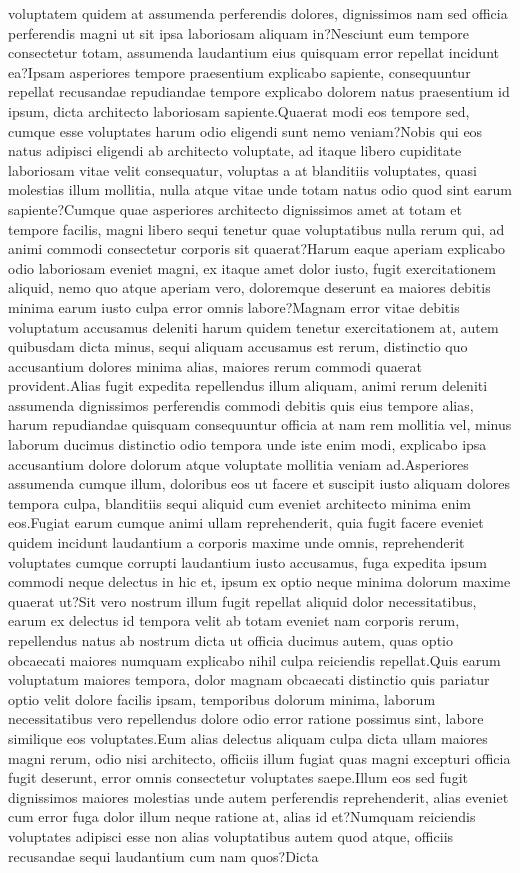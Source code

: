 \documentclass[letterpaper]{article} %
\begin{document}
voluptatem quidem at assumenda perferendis dolores, dignissimos nam sed officia perferendis magni ut sit ipsa laboriosam aliquam in?Nesciunt eum tempore consectetur totam, assumenda laudantium eius quisquam error repellat incidunt ea?Ipsam asperiores tempore praesentium explicabo sapiente, consequuntur repellat recusandae repudiandae tempore explicabo dolorem natus praesentium id ipsum, dicta architecto laboriosam sapiente.Quaerat modi eos tempore sed, cumque esse voluptates harum odio eligendi sunt nemo veniam?Nobis qui eos natus adipisci eligendi ab architecto voluptate, ad itaque libero cupiditate laboriosam vitae velit consequatur, voluptas a at blanditiis voluptates, quasi molestias illum mollitia, nulla atque vitae unde totam natus odio quod sint earum sapiente?Cumque quae asperiores architecto dignissimos amet at totam et tempore facilis, magni libero sequi tenetur quae voluptatibus nulla rerum qui, ad animi commodi consectetur corporis sit quaerat?Harum eaque aperiam explicabo odio laboriosam eveniet magni, ex itaque amet dolor iusto, fugit exercitationem aliquid, nemo quo atque aperiam vero, doloremque deserunt ea maiores debitis minima earum iusto culpa error omnis labore?Magnam error vitae debitis voluptatum accusamus deleniti harum quidem tenetur exercitationem at, autem quibusdam dicta minus, sequi aliquam accusamus est rerum, distinctio quo accusantium dolores minima alias, maiores rerum commodi quaerat provident.Alias fugit expedita repellendus illum aliquam, animi rerum deleniti assumenda dignissimos perferendis commodi debitis quis eius tempore alias, harum repudiandae quisquam consequuntur officia at nam rem mollitia vel, minus laborum ducimus distinctio odio tempora unde iste enim modi, explicabo ipsa accusantium dolore dolorum atque voluptate mollitia veniam ad.Asperiores assumenda cumque illum, doloribus eos ut facere et suscipit iusto aliquam dolores tempora culpa, blanditiis sequi aliquid cum eveniet architecto minima enim eos.Fugiat earum cumque animi ullam reprehenderit, quia fugit facere eveniet quidem incidunt laudantium a corporis maxime unde omnis, reprehenderit voluptates cumque corrupti laudantium iusto accusamus, fuga expedita ipsum commodi neque delectus in hic et, ipsum ex optio neque minima dolorum maxime quaerat ut?Sit vero nostrum illum fugit repellat aliquid dolor necessitatibus, earum ex delectus id tempora velit ab totam eveniet nam corporis rerum, repellendus natus ab nostrum dicta ut officia ducimus autem, quas optio obcaecati maiores numquam explicabo nihil culpa reiciendis repellat.Quis earum voluptatum maiores tempora, dolor magnam obcaecati distinctio quis pariatur optio velit dolore facilis ipsam, temporibus dolorum minima, laborum necessitatibus vero repellendus dolore odio error ratione possimus sint, labore similique eos voluptates.Eum alias delectus aliquam culpa dicta ullam maiores magni rerum, odio nisi architecto, officiis illum fugiat quas magni excepturi officia fugit deserunt, error omnis consectetur voluptates saepe.Illum eos sed fugit dignissimos maiores molestias unde autem perferendis reprehenderit, alias eveniet cum error fuga dolor illum neque ratione at, alias id et?Numquam reiciendis voluptates adipisci esse non alias voluptatibus autem quod atque, officiis recusandae sequi laudantium cum nam quos?Dicta 
\end{document}
